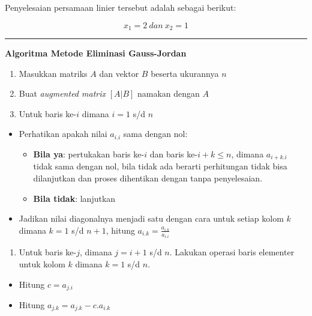 \documentclass[
]{book}
\providecommand{\tightlist}{%
  \setlength{\itemsep}{0pt}\setlength{\parskip}{0pt}}
\theoremstyle{definition}
\theoremstyle{definition}
\theoremstyle{definition}
\theoremstyle{definition}
\theoremstyle{remark}
\begin{document}
Penyelesaian persamaan linier tersebut adalah sebagai berikut:

\[
x_1=2\ dan\ x_2=1
\]

\begin{center}\rule{0.5\linewidth}{0.5pt}\end{center}

\textbf{Algoritma Metode Eliminasi Gauss-Jordan}

\begin{enumerate}
\def\labelenumi{\arabic{enumi}.}
\tightlist
\item
  Masukkan matriks \(A\) dan vektor \(B\) beserta ukurannya \(n\)
\item
  Buat \emph{augmented matrix} \(\left[A|B\right]\) namakan dengan \(A\)
\item
  Untuk baris ke-\(i\) dimana \(i=1\) s/d \(n\)
\end{enumerate}

\begin{itemize}
\item
  Perhatikan apakah nilai \(a_{i.i}\) sama dengan nol:

  \begin{itemize}
  \tightlist
  \item
    \textbf{Bila ya}: pertukakan baris ke-\(i\) dan baris ke-\(i+k\le n\), dimana \(a_{i+k.i}\) tidak sama dengan nol, bila tidak ada berarti perhitungan tidak bisa dilanjutkan dan proses dihentikan dengan tanpa penyelesaian.
  \item
    \textbf{Bila tidak}: lanjutkan
  \end{itemize}
\item
  Jadikan nilai diagonalnya menjadi satu dengan cara untuk setiap kolom \(k\) dimana \(k=1\) s/d \(n+1\), hitung \(a_{i.k}=\frac{a_{i.k}}{a_{i.i}}\)
\end{itemize}

\begin{enumerate}
\def\labelenumi{\arabic{enumi}.}
\setcounter{enumi}{3}
\tightlist
\item
  Untuk baris ke-\(j\), dimana \(j=i+1\) s/d \(n\). Lakukan operasi baris elementer untuk kolom \(k\) dimana \(k=1\) s/d \(n\).
\end{enumerate}

\begin{itemize}
\tightlist
\item
  Hitung \(c=a_{j.i}\)
\item
  Hitung \(a_{j.k}=a_{j.k}-c.a_{i.k}\)
\end{itemize}
\end{document}
